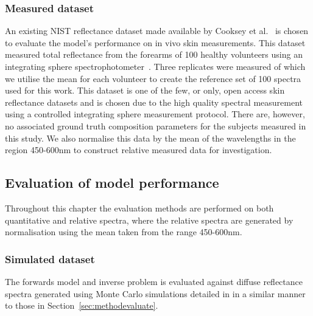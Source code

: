 \subsubsection{Measured dataset}
An existing NIST reflectance dataset made available by Cooksey et al.~\citep{Cooksey2017} is chosen to evaluate the model's performance on in vivo skin measurements. This dataset measured total reflectance from the forearms of 100 healthy volunteers using an integrating sphere spectrophotometer~\citep{Cooksey2017}. Three replicates were measured of which we utilise the mean for each volunteer to create the reference set of 100 spectra used for this work. This dataset is one of the few, or only, open access skin reflectance datasets and is chosen due to the high quality spectral measurement using a controlled integrating sphere measurement protocol. There are, however, no associated ground truth composition parameters for the subjects measured in this study. We also normalise this data by the mean of the wavelengths in the region 450-600nm to construct relative measured data for investigation. 
\FloatBarrier

\subsection{Evaluation of model performance}\label{sec:methodevaluate2}
Throughout this chapter the evaluation methods are performed on both quantitative and relative spectra, where the relative spectra are generated by normalisation using the mean taken from the range 450-600nm.
\subsubsection{Simulated dataset}
The forwards model and inverse problem is evaluated against diffuse reflectance spectra generated using Monte Carlo simulations detailed in  in a similar manner to those in Section~\ref{sec:methodevaluate}. 
%


